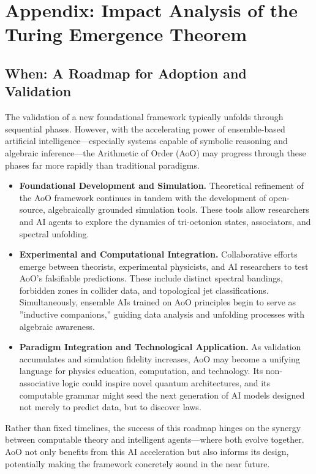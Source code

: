 \documentclass[11pt, a4paper]{article}
\theoremstyle{definition}
\theoremstyle{remark}
\begin{document}
\section{Appendix: Impact Analysis of the Turing Emergence Theorem}

\subsection*{When: A Roadmap for Adoption and Validation}
The validation of a new foundational framework typically unfolds through sequential phases. However, with the accelerating power of ensemble-based artificial intelligence—especially systems capable of symbolic reasoning and algebraic inference—the Arithmetic of Order (AoO) may progress through these phases far more rapidly than traditional paradigms.
\begin{itemize}
    \item \textbf{Foundational Development and Simulation.} Theoretical refinement of the AoO framework continues in tandem with the development of open-source, algebraically grounded simulation tools. These tools allow researchers and AI agents to explore the dynamics of tri-octonion states, associators, and spectral unfolding.
    \item \textbf{Experimental and Computational Integration.} Collaborative efforts emerge between theorists, experimental physicists, and AI researchers to test AoO’s falsifiable predictions. These include distinct spectral bandings, forbidden zones in collider data, and topological jet classifications. Simultaneously, ensemble AIs trained on AoO principles begin to serve as ”inductive companions,” guiding data analysis and unfolding processes with algebraic awareness.
    \item \textbf{Paradigm Integration and Technological Application.} As validation accumulates and simulation fidelity increases, AoO may become a unifying language for physics education, computation, and technology. Its non-associative logic could inspire novel quantum architectures, and its computable grammar might seed the next generation of AI models designed not merely to predict data, but to discover laws.
\end{itemize}
Rather than fixed timelines, the success of this roadmap hinges on the synergy between computable theory and intelligent agents—where both evolve together. AoO not only benefits from this AI acceleration but also informs its design, potentially making the framework concretely sound in the near future.
\end{document}
